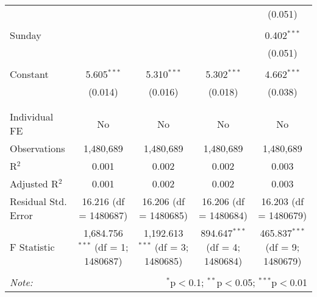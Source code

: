 \documentclass[
]{article}
\begin{document}
\begin{table}[!htbp]
{\begin{tabular}{@{\extracolsep{5pt}}lcccc}
  &  &  &  & (0.051) \\ 
  & & & & \\ 
 Sunday &  &  &  & 0.402$^{***}$ \\ 
  &  &  &  & (0.051) \\ 
  & & & & \\ 
 Constant & 5.605$^{***}$ & 5.310$^{***}$ & 5.302$^{***}$ & 4.662$^{***}$ \\ 
  & (0.014) & (0.016) & (0.018) & (0.038) \\ 
  & & & & \\ 
\hline \\[-1.8ex] 
Individual FE & No & No & No & No \\ 
Observations & 1,480,689 & 1,480,689 & 1,480,689 & 1,480,689 \\ 
R$^{2}$ & 0.001 & 0.002 & 0.002 & 0.003 \\ 
Adjusted R$^{2}$ & 0.001 & 0.002 & 0.002 & 0.003 \\ 
Residual Std. Error & 16.216 (df = 1480687) & 16.206 (df = 1480685) & 16.206 (df = 1480684) & 16.203 (df = 1480679) \\ 
F Statistic & 1,684.756$^{***}$ (df = 1; 1480687) & 1,192.613$^{***}$ (df = 3; 1480685) & 894.647$^{***}$ (df = 4; 1480684) & 465.837$^{***}$ (df = 9; 1480679) \\ 
\hline 
\hline \\[-1.8ex] 
\textit{Note:}  & \multicolumn{4}{r}{$^{*}$p$<$0.1; $^{**}$p$<$0.05; $^{***}$p$<$0.01} \\ 
\end{tabular}
} 
\end{table} 
\newpage
\end{document}
